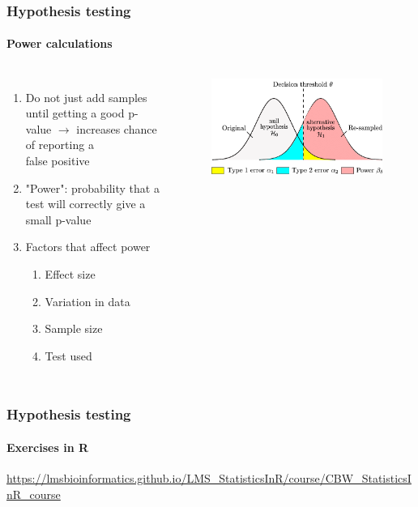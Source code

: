 \documentclass[aspectratio=43]{beamer}
\begin{document}
\begin{frame}
	
	\frametitle{Hypothesis testing}
	\framesubtitle{Power calculations}
	
	\footnotesize
	
	\begin{columns}
		
		
		\begin{enumerate}
			\item Do not just add samples until getting a good p-value $\rightarrow$ increases chance of reporting a \\false positive
			\item "Power": probability that a test will {\color{blue}correctly} give a small p-value
			\item Factors that affect power
			\begin{enumerate}
				\item Effect size
				\item Variation in data
				\item Sample size
				\item Test used
			\end{enumerate}
		\end{enumerate}
		
		
		\begin{figure}[!htb]
			\includegraphics[width = \linewidth]{plots/part3/hypothesis.png}
		\end{figure}
		
	\end{columns}

\end{frame}

\begin{frame}
	
	\frametitle{Hypothesis testing}
	\framesubtitle{Exercises in R}
	
	\footnotesize
	
	\href{https://lmsbioinformatics.github.io/LMS_StatisticsInR/course/CBW_StatisticsInR_course.html\#/54}{https://lmsbioinformatics.github.io/LMS\_StatisticsInR/course/CBW\_StatisticsInR\_course}

\end{frame}
\end{document}
